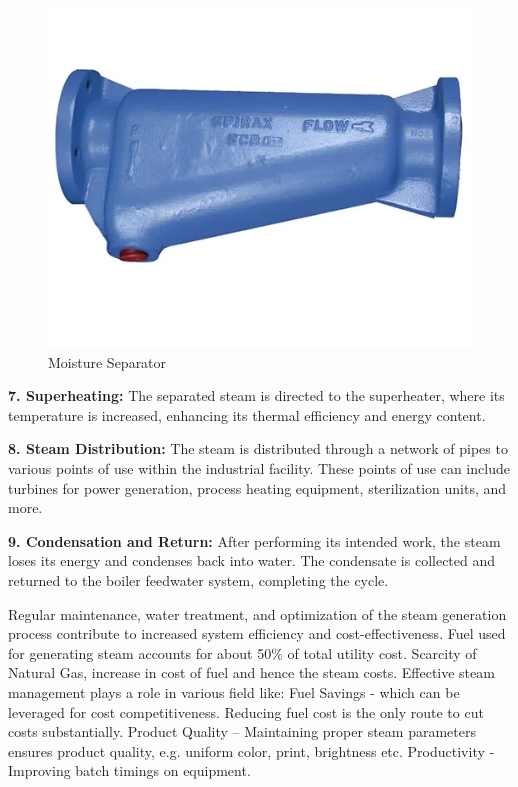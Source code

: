 \begin{figure}[h!]
    \centering
    \includegraphics[width=0.8\linewidth]{figs/lastmin/Moisture Separator.png}
    \caption{Moisture Separator}
    \label{fig:moisture_separator}
\end{figure}

\textbf{7. Superheating:} The separated steam is directed to the
superheater, where its temperature is increased, enhancing its thermal efficiency and energy content.

\textbf{8. Steam Distribution:} The steam is distributed through a network of pipes to various points of use within the industrial facility. These points of use can include turbines for power generation, process heating equipment, sterilization units, and more.

\textbf{9. Condensation and Return:} After performing its intended work, the steam loses its energy and condenses back into water. The condensate is collected and returned to the boiler feedwater system, completing the cycle.

Regular maintenance, water treatment, and optimization of the steam generation process contribute to increased system efficiency and cost-effectiveness.
Fuel used for generating steam accounts for about 50\% of total utility cost. Scarcity of Natural Gas, increase in cost of fuel and hence the steam costs. Effective steam management plays a role in various field like:
Fuel Savings - which can be leveraged for cost competitiveness. Reducing fuel cost is the only route to cut costs substantially.
Product Quality – Maintaining proper steam parameters ensures product quality, e.g. uniform color, print, brightness etc.
Productivity - Improving batch timings on equipment.

